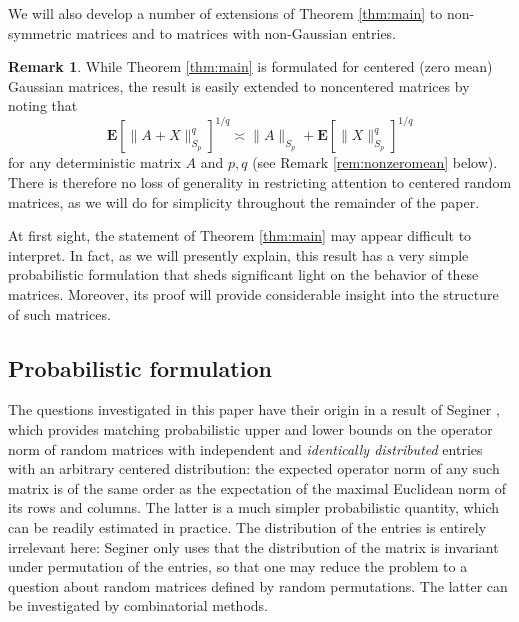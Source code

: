 \documentclass[10pt,reqno]{amsart}
\theoremstyle{definition}
\newtheorem{rem}[thm]{Remark}
\numberwithin{equation}{section}
\numberwithin{figure}{section}
\numberwithin{table}{section}
\begin{document}
We will also develop a number of extensions of Theorem \ref{thm:main} to 
non-symmetric matrices and to matrices with non-Gaussian entries.

\begin{rem}
While Theorem \ref{thm:main} is formulated for centered (zero 
mean) Gaussian matrices, 
the result is easily extended to noncentered matrices by noting that
$$
	\mathbf{E}[\|A+X\|_{S_p}^q]^{1/q} \asymp \|A\|_{S_p} + 
	\mathbf{E}[\|X\|_{S_p}^q]^{1/q}
$$
for any deterministic matrix $A$ and $p,q$ (see Remark 
\ref{rem:nonzeromean} below). There is therefore no loss of generality in 
restricting attention to centered random matrices, as we will do for 
simplicity throughout the remainder of the paper.
\end{rem}

At first sight, the statement of Theorem \ref{thm:main} may appear 
difficult to interpret. In fact, as we will presently explain, this result 
has a very simple probabilistic formulation that sheds significant light 
on the behavior of these matrices. Moreover, its proof will provide 
considerable insight into the structure of such matrices.

\subsection{Probabilistic formulation}

The questions investigated in this paper have their origin in a result of 
Seginer \cite{Seg00}, which provides matching probabilistic upper and 
lower bounds on the operator norm of random matrices with independent and 
\emph{identically distributed} entries with an arbitrary centered 
distribution: the expected operator norm of any such matrix is of the same 
order as the expectation of the maximal Euclidean norm of its rows and 
columns. The latter is a much simpler probabilistic quantity, which can be 
readily estimated in practice. The distribution of the entries is entirely 
irrelevant here: Seginer only uses that the distribution of the matrix is 
invariant under permutation of the entries, so that one may reduce the 
problem to a question about random matrices defined by random 
permutations. The latter can be investigated by combinatorial methods.
\end{document}
